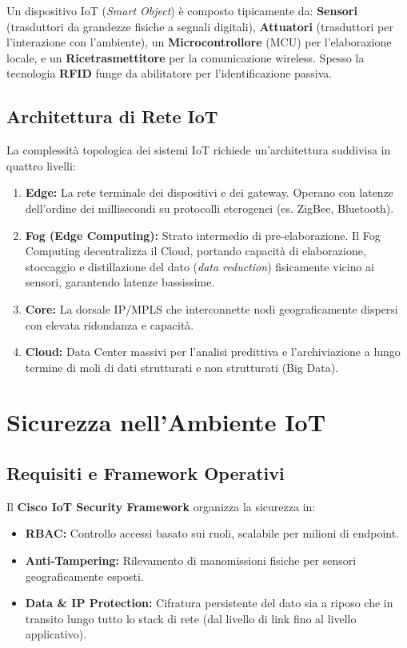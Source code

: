 Un dispositivo IoT (\textit{Smart Object}) è composto tipicamente da: \textbf{Sensori} (trasduttori da grandezze fisiche a segnali digitali), \textbf{Attuatori} (trasduttori per l'interazione con l'ambiente), un \textbf{Microcontrollore} (MCU) per l'elaborazione locale, e un \textbf{Ricetrasmettitore} per la comunicazione wireless. Spesso la tecnologia \textbf{RFID} funge da abilitatore per l'identificazione passiva.



\subsection{Architettura di Rete IoT}
La complessità topologica dei sistemi IoT richiede un'architettura suddivisa in quattro livelli:
\begin{enumerate}
    \item \textbf{Edge:} La rete terminale dei dispositivi e dei gateway. Operano con latenze dell'ordine dei millisecondi su protocolli eterogenei (es. ZigBee, Bluetooth).
    \item \textbf{Fog (Edge Computing):} Strato intermedio di pre-elaborazione. Il Fog Computing decentralizza il Cloud, portando capacità di elaborazione, stoccaggio e distillazione del dato (\textit{data reduction}) fisicamente vicino ai sensori, garantendo latenze bassissime.
    \item \textbf{Core:} La dorsale IP/MPLS che interconnette nodi geograficamente dispersi con elevata ridondanza e capacità.
    \item \textbf{Cloud:} Data Center massivi per l'analisi predittiva e l'archiviazione a lungo termine di moli di dati strutturati e non strutturati (Big Data).
\end{enumerate}

\section{Sicurezza nell'Ambiente IoT}
\subsection{Requisiti e Framework Operativi}
Il \textbf{Cisco IoT Security Framework} organizza la sicurezza in:
\begin{itemize}
    \item \textbf{RBAC:} Controllo accessi basato sui ruoli, scalabile per milioni di endpoint.
    \item \textbf{Anti-Tampering:} Rilevamento di manomissioni fisiche per sensori geograficamente esposti.
    \item \textbf{Data \& IP Protection:} Cifratura persistente del dato sia a riposo che in transito lungo tutto lo stack di rete (dal livello di link fino al livello applicativo).
\end{itemize}

